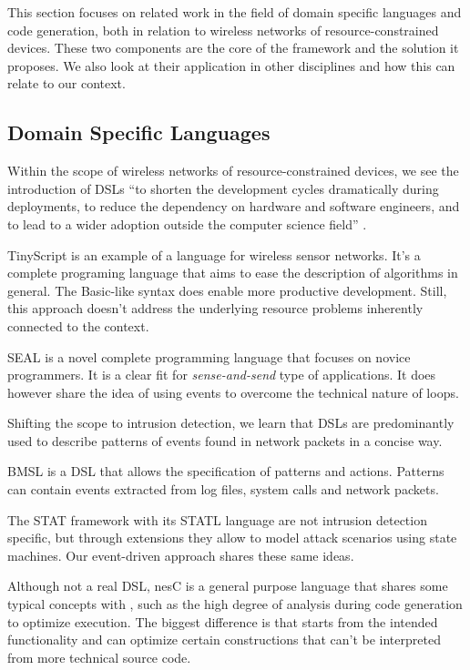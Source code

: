 \documentclass[conference]{IEEEtran}
\begin{document}
This section focuses on related work in the field of domain specific languages
and code generation, both in relation to wireless networks of
resource-constrained devices. These two components are the core of the \NAME
framework and the solution it proposes. We also look at their application in
other disciplines and how this can relate to our context.

\subsection{Domain Specific Languages}

Within the scope of wireless networks of resource-constrained devices, we see
the introduction of DSLs \enquote{to shorten the development cycles
dramatically during deployments, to reduce the dependency on hardware and
software engineers, and to lead to a wider adoption outside the computer
science field} \cite{sadilek2008domain}.

TinyScript \cite{levis2004tinyscript} is an example of a language for wireless
sensor networks. It's a complete programing language that aims to ease the
description of algorithms in general. The Basic-like syntax does enable more
productive development. Still, this approach doesn't address the underlying
resource problems inherently connected to the context.

SEAL \cite{elsts2013seal} is a novel complete programming language that focuses
on novice programmers. It is a clear fit for \emph{sense-and-send} type of
applications. It does however share the idea of using events to overcome the
technical nature of loops.

Shifting the scope to intrusion detection, we learn that DSLs are predominantly
used to describe patterns of events found in network
packets \cite{sekar1999high,roesch1999snort} in a concise way.

BMSL \cite{uppuluri2001experiences} is a DSL that allows the specification of
patterns and actions. Patterns can contain events extracted from log files,
system calls and network packets.

The STAT framework with its STATL language
\cite{eckmann2002statl,vigna2003designing} are not intrusion detection
specific, but through extensions they allow to model attack scenarios using
state machines. Our event-driven approach shares these same ideas.

Although not a real DSL, nesC \cite{gay2003nesc} is a general purpose language
that shares some typical concepts with \NAME, such as the high degree of
analysis during code generation to optimize execution. The biggest difference
is that \NAME starts from the intended functionality and can optimize certain
constructions that can't be interpreted from more technical source code.
\end{document}
